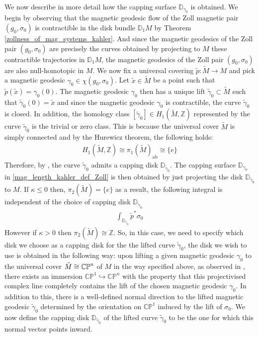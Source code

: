 \documentclass[11pt]{amsart}
\theoremstyle{plain}
\theoremstyle{definition}
\theoremstyle{remark}
\begin{document}
We now describe in more detail how the capping surface $\mathbb{D}_{\gamma_0}$ is obtained. We begin by observing that the magnetic geodesic flow of the Zoll magnetic pair $(g_0,\sigma_0)$ is contractible in the disk bundle $\mathbb{D}_1M$ by Theorem \ref{zollness_of_mag_systems_kahler}. And since the magnetic geodesics of the Zoll pair $(g_0,\sigma_0)$ are precisely the curves obtained by projecting to $M$ these contractible trajectories in $\mathbb{D}_1M$, the magnetic geodesics of the Zoll pair $(g_0,\sigma_0)$ are also null-homotopic in $M$. We now fix a universal covering $\tilde p: \tilde M \rightarrow M$ and pick a magnetic geodesic $\gamma_0 \in \chi(g_0,\sigma_0)$. Let $\tilde x \in \tilde M$ be a point such that $\tilde p(\tilde x) =\gamma_0(0)$. The magnetic geodesic $\gamma_0$ then has a unique lift $\tilde \gamma_0 \subset \tilde M$ such that $\tilde \gamma_0(0)=\tilde x$ and since the magnetic geodesic $\gamma_0$ is contractible, the curve $\tilde \gamma_0$ is closed. In addition, the homology class $[\tilde \gamma_0] \in H_1(\tilde M,\mathbb{Z})$ represented by the curve $\tilde \gamma_0$ is the trivial or zero class. This is because the universal cover $\tilde M$ is simply connected and by the Hurewicz theorem, the following holds:
\begin{align}
     H_1(\tilde M,\mathbb{Z}) \cong \pi_1(\tilde M)_{\text{ab}} \cong \{e\}
\end{align}
Therefore, by \cite[Proposition 3.4.8]{Geiges_book}, the curve $\tilde \gamma_0$ admits a capping disk $\mathbb{D}_{\tilde \gamma_0}$. The capping surface $\mathbb{D}_{\gamma_0}$ in \eqref{mag_length_kahler_def_Zoll} is then obtained by just projecting the disk $\mathbb{D}_{\tilde \gamma_0}$ to $M$. If $\kappa \leq 0$ then, $\pi_2(\tilde M) = \{e\}$ as a result, the following integral is independent of the choice of capping disk $\mathbb{D}_{\tilde \gamma_0}$
\begin{align}
    \int_{\mathbb{D}_{\tilde \gamma_0}} \tilde p^*\sigma_0
\end{align}
However if $\kappa >0$ then $\pi_2(\tilde M) \cong \mathbb{Z}$. So, in this case, we need to specify which disk we choose as a capping disk for the the lifted curve $\tilde \gamma_0$, the disk we wish to use is obtained in the following way: upon lifting a given magnetic geodesic $\gamma_0$ to the universal cover $\Tilde{M} \cong \mathbb{CP}^n$ of $M$ in the way specified above, as observed in \cite[Pg. 27]{johanna_projective}, there exists an immersion $\mathbb{CP}^1 \hookrightarrow \mathbb{CP}^n$ with the property that this projectivised complex line completely contains the lift of the chosen magnetic geodesic $\gamma_0$. In addition to this, there is a well-defined normal direction to the lifted magnetic geodesic $\tilde \gamma_0$ determined by the orientation on $\mathbb{CP}^1$ induced by the lift of $\sigma_0$. We now define the capping disk $\mathbb{D}_{\tilde \gamma_0}$ of the lifted curve $\tilde \gamma_0$ to be the one for which this normal vector points inward.\\
\end{document}
